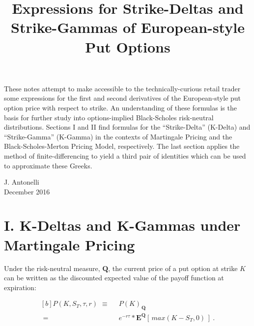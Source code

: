 \documentclass[12pt]{article}
\title{Expressions for Strike-Deltas and Strike-Gammas of European-style Put Options}
\date{}
\begin{document}
\maketitle

\begin{paragraph}
\indent \small These notes attempt to make accessible to the technically-curious retail trader some expressions for the first and second derivatives of the European-style put option price with respect to strike. An understanding of these formulas is the basis for further study into options-implied Black-Scholes risk-neutral distributions. Sections I and II find formulas for the ``Strike-Delta'' (K-Delta) and ``Strike-Gamma'' (K-Gamma) in the contexts of Martingale Pricing and the Black-Scholes-Merton Pricing Model, respectively. The last section applies the method of finite-differencing to yield a third pair of identities which can be used to approximate these Greeks.
\end{paragraph}

\vspace{300pt}

\begin{center} 
\footnotesize J. Antonelli \\[3pt] December 2016
\end{center}

\pagebreak

\section*{\large I. \indent K-Deltas and K-Gammas under Martingale Pricing}

\vspace{15pt}

\begin{paragraph}
\indent Under the risk-neutral measure, $\mathbf{Q}$, the current price of a put option at strike $K$ can be written as the discounted expected value of the payoff function at expiration:
\end{paragraph}

\vspace{10pt}

\begin{equation}
\begin{aligned}[b]
P(K, S_{T}, \tau, r)   \hspace{4pt} \equiv& \hspace{7pt}   P(K)_{\hspace{1pt} \mathbf{Q}}   
\\[12pt]
\hspace{4pt} =& \hspace{7pt}   e^{-r \tau} * \mathbf{E^{Q}}[\hspace{2pt} max(K-S_{T},0) \hspace{2pt}] \hspace{3pt}.
\end{aligned}
\end{equation}
\end{document}
